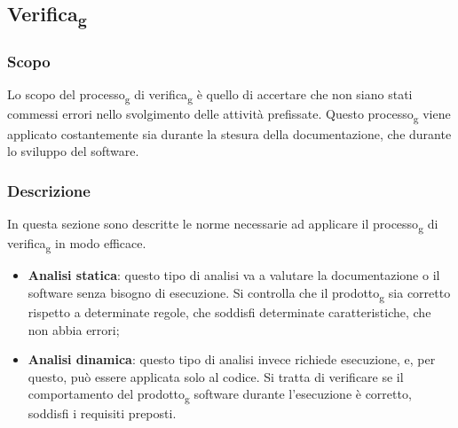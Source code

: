 \subsection{Verifica\textsubscript{g}}
\subsubsection{Scopo}
Lo scopo del processo\textsubscript{g} di verifica\textsubscript{g} è quello di accertare che non siano stati commessi 
errori nello svolgimento delle attività prefissate. Questo processo\textsubscript{g} viene applicato 
costantemente sia durante la stesura della documentazione, che durante lo sviluppo 
del software. 

\subsubsection{Descrizione}
In questa sezione sono descritte le norme necessarie ad applicare il processo\textsubscript{g} di 
verifica\textsubscript{g} in modo efficace.
\begin{itemize}
    \item \textbf{Analisi statica}: questo tipo di analisi va a valutare la 
    documentazione o il software senza bisogno di esecuzione. Si controlla che il 
    prodotto\textsubscript{g} sia corretto rispetto a determinate regole, che soddisfi determinate 
    caratteristiche, che non abbia errori;
    \item \textbf{Analisi dinamica}: questo tipo di analisi invece richiede esecuzione, e, per 
    questo, può essere applicata solo al codice. Si tratta di verificare se il comportamento del 
    prodotto\textsubscript{g} software durante l’esecuzione è corretto, soddisfi i requisiti preposti.
\end{itemize} 

